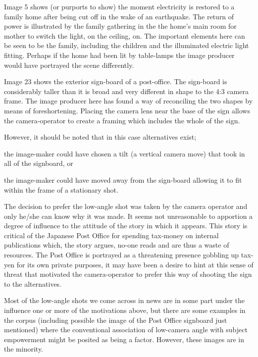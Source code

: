 \begin{description}
Image 5 shows (or purports to show) the moment electricity is restored to a family home after being cut off in the wake of an earthquake. The return of power is illustrated by the family gathering in the the home's main room for  mother to switch the light, on the ceiling, on. The important elements here can be seen to be the family, including the children and the illuminated electric light fitting. Perhaps if the home had been lit by table-lamps the image producer would have portrayed the scene differently.
\item [Technical Motivation] Image 23 shows the exterior sign-board of a post-office. The sign-board is considerably taller than it is broad and very different in shape to the 4:3 camera frame. The image producer here has found a way of reconciling the two shapes by means of foreshortening. Placing the camera lens near the base of the sign allows the camera-operator to create a framing which includes the whole of the sign. 

However, it should be noted that in this case alternatives exist;
\begin{close_enum}
\item the image-maker could have chosen a tilt (a vertical camera move) that took in all of the signboard, or  
\item the image-maker could have moved away from the sign-board allowing it to fit within the frame of a stationary shot.
\end{close_enum}

The decision to prefer the low-angle shot was taken by the camera operator and only he/she can know why it was made. It seems not unreasonable to apportion a degree of influence to the attitude of the story in which it appears. This story is critical of the Japanese Post Office for spending tax-money on internal publications which, the story argues, no-one reads and are thus a waste of resources. The Post Office is portrayed as a threatening presence gobbling up tax-yen for its own private purposes, it may have been a desire to hint at this sense of threat that motivated the camera-operator to prefer this way of shooting the sign to the alternatives.
\end{description}

Most of the low-angle shots we come across in news are in some part under the influence one or more of the motivations above, but there are some examples in the corpus (including possible the image of the Post Office signboard just mentioned) where the conventional association of low-camera angle with subject empowerment might be posited as being a factor. However, these images are in the minority.


